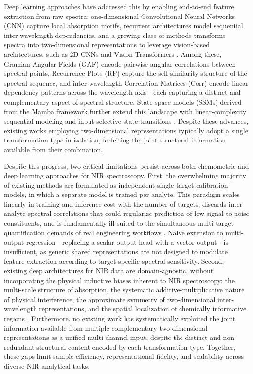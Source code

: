 \documentclass[pdflatex,sn-mathphys-num]{sn-jnl}%
\begin{document}
Deep learning approaches have addressed this by enabling end-to-end feature extraction from raw spectra: one-dimensional Convolutional Neural Networks (CNN) \cite{kiranyaz2021survey,zhang2019deepspectra,walsh2024evaluation,
li2024quantitative} capture local absorption motifs, recurrent architectures \cite{hochreiter1997lstm} model sequential inter-wavelength dependencies, and a growing class of methods transforms spectra into two-dimensional representations to leverage vision-based architectures, such as 2D-CNNs and Vision Transformers \cite{van2024nirsvit}. Among these, Gramian Angular Fields (GAF) encode pairwise angular correlations between spectral points, Recurrence Plots (RP) capture the self-similarity structure of the spectral sequence, and inter-wavelength Correlation Matrices (Corr) encode linear dependency patterns across the wavelength axis \cite{jin2023innovative, liu2022determination} - each capturing a distinct and complementary aspect of spectral structure. State-space models (SSMs) derived from the Mamba framework further extend this landscape with linear-complexity sequential modeling and input-selective state transitions \cite{shi2025state}. Despite these advances, existing works employing two-dimensional representations typically adopt a single transformation type in isolation, forfeiting the joint structural information available from their combination.

Despite this progress, two critical limitations persist across both chemometric and deep learning approaches for NIR spectroscopy. First, the overwhelming majority of existing methods are formulated as independent single-target calibration models, in which a separate model is trained per analyte. This paradigm scales linearly in training and inference cost with the number of targets, discards inter-analyte spectral correlations that could regularize prediction of low-signal-to-noise constituents, and is fundamentally ill-suited to the simultaneous multi-target quantification demands of real engineering workflows \cite{NobariMultivariate}. Naive extension to multi-output regression - replacing a scalar output head with a vector output - is insufficient, as generic shared representations are not designed to modulate feature extraction according to target-specific spectral sensitivity. Second, existing deep architectures for NIR data are domain-agnostic, without incorporating the physical inductive biases inherent to NIR spectroscopy: the multi-scale structure of absorption, the systematic additive-multiplicative nature of physical interference, the approximate symmetry of two-dimensional inter-wavelength representations, and the spatial localization of chemically informative regions \cite{zhang2022review,wang2025nirs}. Furthermore, no existing work has systematically exploited the joint information available from multiple complementary two-dimensional representations as a unified multi-channel input, despite the distinct and non-redundant structural content encoded by each transformation type. Together, these gaps limit sample efficiency, representational fidelity, and scalability across diverse NIR analytical 
tasks.
\end{document}
